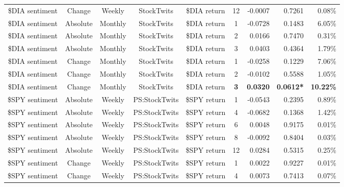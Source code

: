 \begin{longtable}{ccccccrrrrr}
    \$DIA sentiment & Change & Weekly & StockTwits & \$DIA return & 12    & -0.0007 & \multicolumn{2}{r}{0.7261} & \multicolumn{2}{r}{0.08\%} \\
    \$DIA sentiment & Absolute & Monthly & StockTwits & \$DIA return & 1     & -0.0728 & \multicolumn{2}{r}{0.1483} & \multicolumn{2}{r}{6.05\%} \\
    \$DIA sentiment & Absolute & Monthly & StockTwits & \$DIA return & 2     & 0.0166 & \multicolumn{2}{r}{0.7470} & \multicolumn{2}{r}{0.31\%} \\
    \$DIA sentiment & Absolute & Monthly & StockTwits & \$DIA return & 3     & 0.0403 & \multicolumn{2}{r}{0.4364} & \multicolumn{2}{r}{1.79\%} \\
    \$DIA sentiment & Change & Monthly & StockTwits & \$DIA return & 1     & -0.0258 & \multicolumn{2}{r}{0.1229} & \multicolumn{2}{r}{7.06\%} \\
    \$DIA sentiment & Change & Monthly & StockTwits & \$DIA return & 2     & -0.0102 & \multicolumn{2}{r}{0.5588} & \multicolumn{2}{r}{1.05\%} \\
    \$DIA sentiment & Change & Monthly & StockTwits & \$DIA return & \textbf{3} & \textbf{0.0320} & \multicolumn{2}{r}{\textbf{0.0612*}} & \multicolumn{2}{r}{\textbf{10.22\%}} \\
    \$SPY sentiment & Absolute & Weekly & PS:StockTwits & \$SPY return & 1     & -0.0543 & \multicolumn{2}{r}{0.2395} & \multicolumn{2}{r}{0.89\%} \\
    \$SPY sentiment & Absolute & Weekly & PS:StockTwits & \$SPY return & 4     & -0.0682 & \multicolumn{2}{r}{0.1368} & \multicolumn{2}{r}{1.42\%} \\
    \$SPY sentiment & Absolute & Weekly & PS:StockTwits & \$SPY return & 6     & 0.0048 & \multicolumn{2}{r}{0.9175} & \multicolumn{2}{r}{0.01\%} \\
    \$SPY sentiment & Absolute & Weekly & PS:StockTwits & \$SPY return & 8     & -0.0092 & \multicolumn{2}{r}{0.8404} & \multicolumn{2}{r}{0.03\%} \\
    \$SPY sentiment & Absolute & Weekly & PS:StockTwits & \$SPY return & 12    & 0.0284 & \multicolumn{2}{r}{0.5315} & \multicolumn{2}{r}{0.25\%} \\
    \$SPY sentiment & Change & Weekly & PS:StockTwits & \$SPY return & 1     & 0.0022 & \multicolumn{2}{r}{0.9227} & \multicolumn{2}{r}{0.01\%} \\
    \$SPY sentiment & Change & Weekly & PS:StockTwits & \$SPY return & 4     & 0.0073 & \multicolumn{2}{r}{0.7413} & \multicolumn{2}{r}{0.07\%} \\

\end{longtable}
